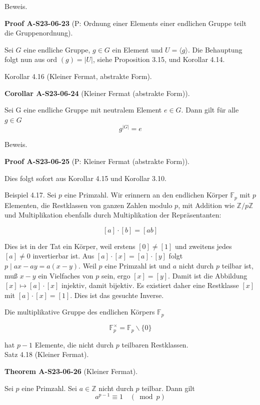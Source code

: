 \documentclass[10pt, letterpaper]{article}
\newcommand{\CustomHeading}[3]{%
  \par\medskip\noindent%
  \textbf{#1 #2} \textnormal{(#3)}.\enskip%
}
\newenvironment{THEO}[2]{\begin{unitbox}\CustomHeading{Theorem}{#1}{#2}}{\end{unitbox}}
\newenvironment{KORO}[2]{\begin{unitbox}\CustomHeading{Corollar}{#1}{#2}}{\end{unitbox}}
\newenvironment{PROOF}[2]{\begin{unitbox}\CustomHeading{Proof}{#1}{#2}}{\end{unitbox}}
\begin{document}
Beweis. 


\begin{PROOF}{A-S23-06-23}{P: Ordnung einer Elements einer endlichen Gruppe teilt die Gruppenordnung}
Sei $G$ eine endliche Gruppe, $g \in G$ ein Element und $U=\langle g\rangle$. Die Behauptung folgt nun aus ord $(g)=|U|$, siehe Proposition 3.15, und Korollar 4.14.
\end{PROOF}

Korollar 4.16 (Kleiner Fermat, abstrakte Form). 

\begin{KORO}{A-S23-06-24}{Kleiner Fermat (abstrakte Form)}
Sei G eine endliche Gruppe mit neutralem Element $e \in G$. Dann gilt für alle $g \in G$
$$
g^{|G|}=e
$$
\end{KORO}


Beweis. 

\begin{PROOF}{A-S23-06-25}{P: Kleiner Fermat (abstrakte Form)}
Dies folgt sofort aus Korollar 4.15 und Korollar 3.10.
\end{PROOF}


Beispiel 4.17. Sei $p$ eine Primzahl. Wir erinnern an den endlichen Körper $\mathbb{F}_{p}$ mit $p$ Elementen, die Restklassen von ganzen Zahlen modulo $p$, mit Addition wie $\mathbb{Z} / p \mathbb{Z}$ und Multiplikation ebenfalls durch Multiplikation der Repräsentanten:

$$
[a] \cdot[b]=[a b]
$$

Dies ist in der Tat ein Körper, weil erstens $[0] \neq[1]$ und zweitens jedes $[a] \neq 0$ invertierbar ist. Aus $[a] \cdot[x]=[a] \cdot[y]$ folgt $p \mid a x-a y=a(x-y)$. Weil $p$ eine Primzahl ist und $a$ nicht durch $p$ teilbar ist, muß $x-y$ ein Vielfaches von $p$ sein, ergo $[x]=[y]$. Damit ist die Abbildung $[x] \mapsto[a] \cdot[x]$ injektiv, damit bijektiv. Es existiert daher eine Restklasse $[x]$ mit $[a] \cdot[x]=[1]$. Dies ist das gesuchte Inverse.

Die multiplikative Gruppe des endlichen Körpers $\mathbb{F}_{p}$

$$
\mathbb{F}_{p}^{\times}=\mathbb{F}_{p} \backslash\{0\}
$$

hat $p-1$ Elemente, die nicht durch $p$ teilbaren Restklassen.\\
Satz 4.18 (Kleiner Fermat). 

\begin{THEO}{A-S23-06-26}{Kleiner Fermat}
Sei $p$ eine Primzahl. Sei $a \in \mathbb{Z}$ nicht durch $p$ teilbar. Dann gilt
$$
a^{p-1} \equiv 1 \quad(\bmod p)
$$
\end{THEO}
\end{document}
